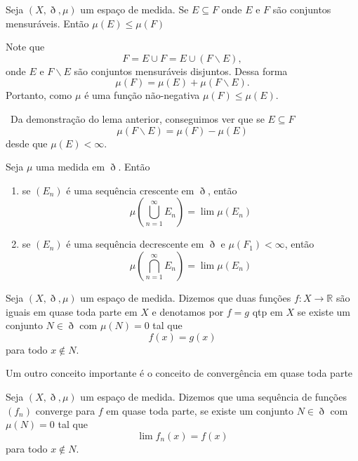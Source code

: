 \documentclass[a4paper, 11pt]{book}
\theoremstyle{definition}
\newcommand{\obs}{\noindent{\textbf{\textcolor{black}{\sffamily Observação:}}}~}
\newcommand{\bR}{\mathbb{R}}
\begin{document}
\begin{lbox}
    Seja $(X,\eth,\mu)$ um espaço de medida.
    Se $E \subseteq F$ onde $E$ e $F$ são conjuntos mensuráveis.
    Então $\mu(E) \leqslant \mu(F)$
\end{lbox}
\begin{prf}
    Note que
    \[
        F = E \cup F = E \cup (F \smallsetminus E),
    \]
    onde $E$ e $F \smallsetminus E$ são conjuntos mensuráveis disjuntos.
    Dessa forma
    \[
        \mu(F) = \mu(E) + \mu(F \smallsetminus E).
    \]
    Portanto, como $\mu$ é uma função não-negativa $\mu(F) \leqslant \mu(E).$
\end{prf}

\obs Da demonstração do lema anterior, conseguimos ver que se $E \subseteq F$
\[
    \mu(F \smallsetminus E) = \mu(F) - \mu(E)
\]
desde que $\mu(E) < \infty$.

\begin{lbox}
    Seja $\mu$ uma medida em $\eth$. Então
    \begin{enumerate}[leftmargin=*, label=\textbf{(\alph*)}]
        \item se $(E_n)$ é uma sequência crescente em $\eth$, então
        \[
            \mu\left( \bigcup_{n=1}^{\infty} E_n \right) = \lim \mu(E_n)
        \]
        \item se $(E_n)$ é uma sequência decrescente em $\eth$ e $\mu(F_1) < \infty$, então
        \[
            \mu\left( \bigcap_{n=1}^{\infty} E_n \right) = \lim \mu(E_n)
        \]
    \end{enumerate}
\end{lbox}
\begin{prf}
    
\end{prf}

\begin{dbox}
    Seja $(X,\eth,\mu)$ um espaço de medida. Dizemos que duas funções $f : X \to \bR$ são iguais em quase toda parte em $X$ e denotamos por $f = g$ qtp em $X$ se existe um conjunto $N \in \eth$ com $\mu(N) = 0$ tal que
    \[
        f(x) = g(x)
    \]
    para todo $x \not\in N$.
\end{dbox}

Um outro conceito importante é o conceito de convergência em quase toda parte

\begin{dbox}
    Seja $(X, \eth, \mu)$ um espaço de medida. Dizemos que uma sequência de funções $(f_n)$ converge para $f$ em quase toda parte, se existe um conjunto $N \in \eth$ com $\mu(N) = 0$ tal que
    \[
        \lim f_n(x) = f(x)
    \]
    para todo $x \not\in N$.
\end{dbox}
\end{document}

